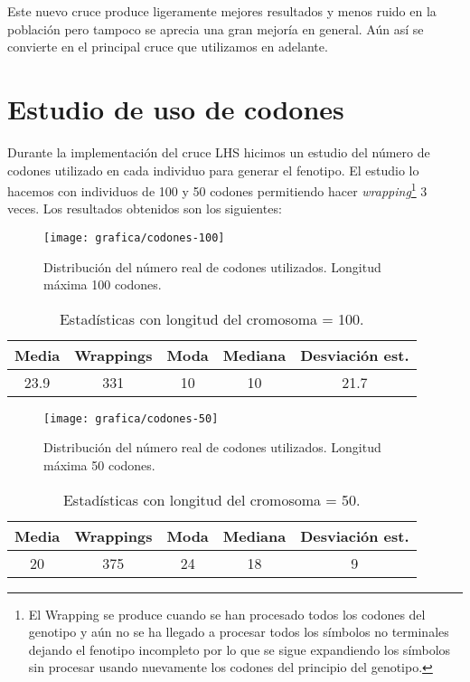 Este nuevo cruce produce ligeramente mejores resultados y menos ruido en la población pero tampoco se aprecia una gran mejoría en general. Aún así se convierte en el principal cruce que utilizamos en adelante.

\section{Estudio de uso de codones}
Durante la implementación del cruce LHS hicimos un estudio del número de codones utilizado en cada individuo para generar el fenotipo. El estudio lo hacemos con individuos de 100 y 50 codones permitiendo hacer \textit{wrapping}\footnote{El Wrapping se produce cuando se han procesado todos los codones del genotipo y aún no se ha llegado a procesar todos los símbolos no terminales dejando el fenotipo incompleto por lo que se sigue expandiendo los símbolos sin procesar usando nuevamente los codones del principio del genotipo.} 3 veces.  Los resultados obtenidos son los siguientes:
\begin{figure}[H]
\centering
\texttt{[image: grafica/codones-100]}
\caption{Distribución del número real de codones utilizados. Longitud máxima 100 codones.}
\end{figure}

\begin{table}[H]
\centering
\begin{tabular}{|c|c|c|c|c|}
\hline
\textbf{Media} & \textbf{Wrappings} & \textbf{Moda} & \textbf{Mediana} & \textbf{Desviación  est.} \\ \hline
23.9           & 331                & 10            & 10               & 21.7                      \\ \hline
\end{tabular}
\caption{Estadísticas con longitud del cromosoma = 100.}
\end{table}

\begin{figure}[H]
\centering
\texttt{[image: grafica/codones-50]}
\caption{Distribución del número real de codones utilizados. Longitud máxima 50 codones.}
\end{figure}

\begin{table}[H]
\centering
\begin{tabular}{|c|c|c|c|c|}
\hline
\textbf{Media} & \textbf{Wrappings} & \textbf{Moda} & \textbf{Mediana} & \textbf{Desviación  est.} \\ \hline
20           & 375                & 24            & 18               & 9                      \\ \hline
\end{tabular}
\caption{Estadísticas con longitud del cromosoma = 50.}
\end{table}

